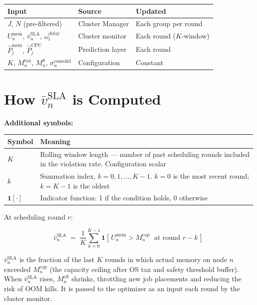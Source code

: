 \documentclass[11pt]{article}
\newcommand{\vbarsla}{\bar{v}_n^{\text{SLA}}}
\newcommand{\Meff}{M_n^{\text{eff}}}
\newcommand{\Mcap}{M_n^{\text{cap}}}
\newcommand{\Mtax}{M_n^{\text{tax}}}
\newcommand{\Mtheta}{M_n^{\theta}}
\newcommand{\sigconsolid}{\sigma_n^{\text{consolid}}}
\newcommand{\Umem}{U_n^{\text{mem}}}
\newcommand{\omdelayt}{\omega_t^{\text{delay}}}
\newcommand{\Pmem}{\hat{P}_j^{\text{mem}}}
\newcommand{\Pcpu}{\hat{P}_j^{\text{CPU}}}
\begin{document}
\medskip
\begin{center}
\small
\begin{tabular}{@{}l l l@{}}
\toprule
Input & Source & Updated \\
\midrule
$J$,\; $N$ (pre-filtered)            & Cluster Manager & Each group per round \\
$\Umem$,\; $\vbarsla$,\; $\omdelayt$ & Cluster monitor & Each round ($K$-window) \\
$\Pmem$,\; $\Pcpu$                  & Prediction layer & Each round \\
$K$,\; $\Mtax$,\; $\Mtheta$,\; $\sigconsolid$ & Configuration & Constant \\
\bottomrule
\end{tabular}
\end{center}

\appendix

\section{How $\bar{v}_n^{\text{SLA}}$ is Computed}
\label{app:vbar}

\noindent\textbf{Additional symbols:}

\begin{center}
\begin{tabular}{@{}l p{10.5cm}@{}}
\toprule
Symbol & Meaning \\
\midrule
$K$ & Rolling window length --- number of past scheduling rounds included
  in the violation rate. Configuration scalar \\[6pt]
$k$ & Summation index, $k = 0, 1, \ldots, K{-}1$. $k=0$ is the most recent
  round; $k = K{-}1$ is the oldest \\[6pt]
$\mathbf{1}[\cdot]$ & Indicator function: 1 if the condition holds, 0
  otherwise \\
\bottomrule
\end{tabular}
\end{center}

\medskip
At scheduling round $r$:

\[
  \bar{v}_n^{\text{SLA}} \;=\;
  \frac{1}{K} \sum_{k=0}^{K-1}
    \mathbf{1}\!\left[\, \Umem > \Mcap \;\text{ at round } r - k \,\right]
\]

$\vbarsla$ is the fraction of the last $K$ rounds in which actual memory on
node $n$ exceeded $\Mcap$ (the capacity ceiling after OS tax and safety
threshold buffer). When $\vbarsla$ rises, $\Meff$ shrinks, throttling new job
placements and reducing the risk of OOM kills. It is passed to the optimizer
as an input each round by the cluster monitor.
\end{document}
